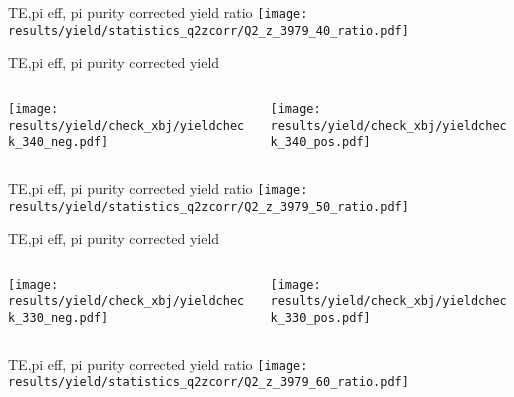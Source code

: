 \begin{frame}{TE,pi eff, pi purity corrected yield ratio}
\texttt{[image: results/yield/statistics\_q2zcorr/Q2\_z\_3979\_40\_ratio.pdf]}
\end{frame}
\begin{frame}{TE,pi eff, pi purity corrected yield}
\begin{columns}
\begin{column}[T]{0.5\textwidth}
\texttt{[image: results/yield/check\_xbj/yieldcheck\_340\_neg.pdf]}
\end{column}
\begin{column}[T]{0.5\textwidth}
\texttt{[image: results/yield/check\_xbj/yieldcheck\_340\_pos.pdf]}
\end{column}
\end{columns}
\end{frame}
\begin{frame}{TE,pi eff, pi purity corrected yield ratio}
\texttt{[image: results/yield/statistics\_q2zcorr/Q2\_z\_3979\_50\_ratio.pdf]}
\end{frame}
\begin{frame}{TE,pi eff, pi purity corrected yield}
\begin{columns}
\begin{column}[T]{0.5\textwidth}
\texttt{[image: results/yield/check\_xbj/yieldcheck\_330\_neg.pdf]}
\end{column}
\begin{column}[T]{0.5\textwidth}
\texttt{[image: results/yield/check\_xbj/yieldcheck\_330\_pos.pdf]}
\end{column}
\end{columns}
\end{frame}
\begin{frame}{TE,pi eff, pi purity corrected yield ratio}
\texttt{[image: results/yield/statistics\_q2zcorr/Q2\_z\_3979\_60\_ratio.pdf]}
\end{frame}

